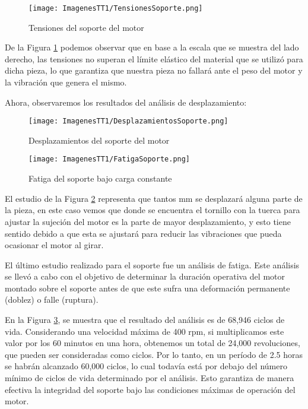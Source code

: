\documentclass[14pt,oneside]{extarticle} %
\begin{document}
\begin{figure}[H]
    \centering
    \texttt{[image: ImagenesTT1/TensionesSoporte.png]}
    \caption{Tensiones del soporte del motor}
    \label{fig:TensionesSoporte}
\end{figure}

\newpage
De la Figura \ref{fig:TensionesSoporte} podemos observar que en base a la escala que se muestra del lado derecho, las tensiones no superan el límite elástico del material que se utilizó para dicha pieza, lo que garantiza que nuestra pieza no fallará ante el peso del motor y la vibración que genera el mismo. 

Ahora, observaremos los resultados del análisis de desplazamiento:

\begin{figure}[H]
    \centering
    \texttt{[image: ImagenesTT1/DesplazamientosSoporte.png]}
    \caption{Desplazamientos del soporte del motor}
    \label{fig:DesplazamientosSoporte}
\end{figure}

\begin{figure}[H]
    \centering
    \texttt{[image: ImagenesTT1/FatigaSoporte.png]}
    \caption{Fatiga del soporte bajo carga constante}
    \label{fig:FatigaSoporte}
\end{figure}

El estudio de la Figura \ref{fig:DesplazamientosSoporte} representa que tantos mm se desplazará alguna parte de la pieza, en este caso vemos que donde se encuentra el tornillo con la tuerca para ajustar la sujeción del motor es la parte de mayor desplazamiento, y esto tiene sentido debido a que esta se ajustará para reducir las vibraciones que pueda ocasionar el motor al girar.

El último estudio realizado para el soporte fue un análisis de fatiga. Este análisis se llevó a cabo con el objetivo de determinar la duración operativa del motor montado sobre el soporte antes de que este sufra una deformación permanente (doblez) o falle (ruptura).

En la Figura \ref{fig:FatigaSoporte}, se muestra que el resultado del análisis es de 68,946 ciclos de vida. Considerando una velocidad máxima de 400 rpm, si multiplicamos este valor por los 60 minutos en una hora, obtenemos un total de 24,000 revoluciones, que pueden ser consideradas como ciclos. Por lo tanto, en un período de 2.5 horas se habrán alcanzado 60,000 ciclos, lo cual todavía está por debajo del número mínimo de ciclos de vida determinado por el análisis. Esto garantiza de manera efectiva la integridad del soporte bajo las condiciones máximas de operación del motor.
\end{document}
